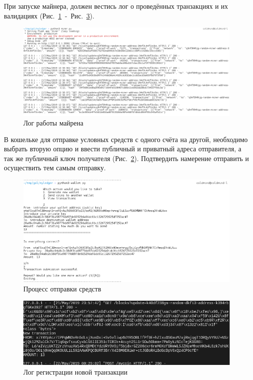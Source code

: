При запуске майнера, должен вестись лог о проведённых транзакциях и их
валидациях (Рис.~\ref{log1}~-~Рис.~\ref{log2}).

\begin{figure}[h!]
    \centering
    \includegraphics[width=\textwidth]{./screenshots/miner_run}
    \caption{Лог работы майрена}\label{log1}
\end{figure}

В кошельке для отправке условных средств с одного счёта на другой, необходимо
выбрать вторую опцию и ввести публичный и приватный адреса отправителя, а так
же публичный ключ получателя (Рис.~\ref{sending}). Подтвердить намерение
отправить и осуществить тем самым отправку.

\begin{figure}[h!]
    \centering
    \includegraphics[width=\textwidth]{./screenshots/sending_sha}
    \caption{Процесс отправки средств}\label{sending}
\end{figure}
\begin{figure}[h!]
    \centering
    \includegraphics[width=\textwidth]{./screenshots/log_send}
    \caption{Лог регистрации новой транзакции}\label{log2}
\end{figure}

